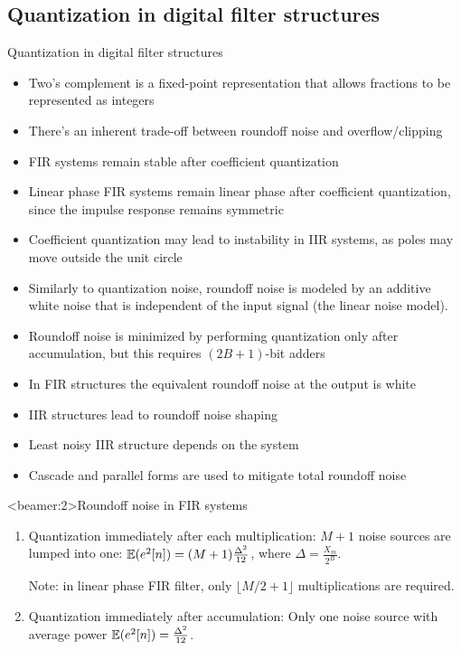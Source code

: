 \documentclass[10pt]{beamer}
\begin{document}
\subsection{Quantization in digital filter structures}
\begin{frame}{Quantization in digital filter structures}
\begin{itemize}
	\item Two's complement is a fixed-point representation that allows fractions to be represented as integers
	\item There's an inherent trade-off between roundoff noise and overflow/clipping
	\item FIR systems remain stable after coefficient quantization
	\item Linear phase FIR systems remain linear phase after coefficient quantization, since the impulse response remains symmetric
	\item Coefficient quantization may lead to instability in IIR systems, as poles may move outside the unit circle
	\item Similarly to quantization noise, roundoff noise is modeled by an additive white noise that is independent of the input signal (the linear noise model).
	\item Roundoff noise is minimized by performing quantization only after accumulation, but this requires $(2B+1)$-bit adders
	\item In FIR structures the equivalent roundoff noise at the output is white
	\item IIR structures lead to roundoff noise shaping
	\item Least noisy IIR structure depends on the system
	\item Cascade and parallel forms are used to mitigate total roundoff noise
\end{itemize}
\end{frame}

\begin{frame}<beamer:2>{Roundoff noise in FIR systems}
\begin{enumerate}
	\item Quantization immediately after each multiplication: $M+1$ noise sources are lumped  into one: $\operatorname{\mathbb{E}}(e^2[n]) = (M+1)\frac{\Delta^2}{12}$, where $\Delta= \frac{X_m}{2^B}$.
	
	Note: in linear phase FIR filter, only $\lfloor M/2+1 \rfloor$ multiplications are required.
 	\begin{center}
		\def\Quantiz{0}
		\resizebox{0.7\textwidth}{!}{}
	\end{center}
	\item Quantization immediately after accumulation:
	Only one noise source with average power $\operatorname{\mathbb{E}}(e^2[n]) = \frac{\Delta^2}{12}$. 
	\begin{center}
		\def\Quantiz{0}
		\resizebox{0.7\textwidth}{!}{}
	\end{center}
\end{enumerate}	
\end{frame}
\end{document}
